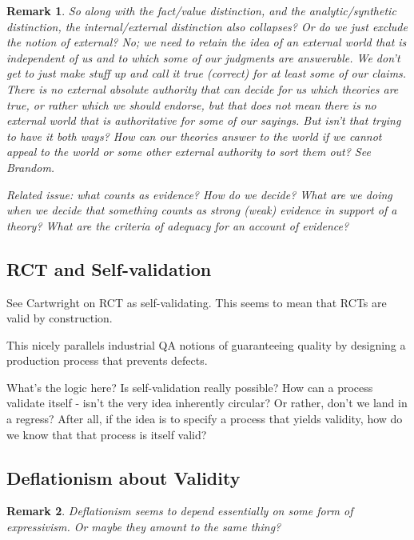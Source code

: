 \documentclass[11pt,twoside]{article}
\newtheorem{remark}{Remark}
\begin{document}
\begin{remark}
  So along with the fact/value distinction, and the analytic/synthetic
  distinction, the internal/external distinction also collapses?  Or
  do we just exclude the notion of external?  No; we need to retain
  the idea of an external world that is independent of us and to which
  some of our judgments are answerable.  We don't get to just make
  stuff up and call it true (correct) for at least some of our claims.
  There is no external absolute authority that can decide for us which
  theories are true, or rather which we should endorse, but that does
  not mean there is no external world that is authoritative for some
  of our sayings.  But isn't that trying to have it both ways?  How
  can our theories answer to the world if we cannot appeal to the
  world or some other external authority to sort them out?  See
  Brandom.

Related issue: what counts as evidence?  How do we decide?  What are
we doing when we decide that something counts as strong (weak)
evidence in support of a theory?  What are the criteria of adequacy
for an account of evidence?
\end{remark}

\subsection{RCT and Self-validation}

See Cartwright on RCT as self-validating.  This seems to mean that
RCTs are valid by construction.

This nicely parallels industrial QA notions of guaranteeing quality by
designing a production process that prevents defects.

What's the logic here?  Is self-validation really possible?  How can a
process validate itself - isn't the very idea inherently circular?  Or
rather, don't we land in a regress?  After all, if the idea is to
specify a process that yields validity, how do we know that that
process is itself valid?

\subsection{Deflationism about Validity}

\begin{remark}
  Deflationism seems to depend essentially on some form of
  expressivism.  Or maybe they amount to the same thing?
\end{remark}
\end{document}
